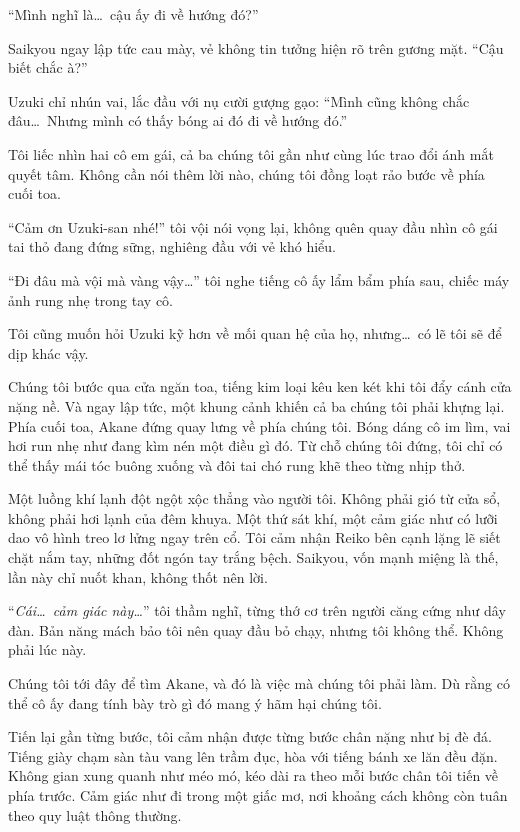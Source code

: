 \documentclass[../main.tex]{subfiles}
\begin{document}
``Mình nghĩ là\dots\ cậu ấy đi về hướng đó?''

Saikyou ngay lập tức cau mày, vẻ không tin tưởng hiện rõ trên gương mặt. ``Cậu biết chắc à?''

Uzuki chỉ nhún vai, lắc đầu với nụ cười gượng gạo: ``Mình cũng không chắc đâu\dots\ Nhưng mình có thấy bóng ai đó đi về hướng đó.''

Tôi liếc nhìn hai cô em gái, cả ba chúng tôi gần như cùng lúc trao đổi ánh mắt quyết tâm. Không cần nói thêm lời nào, chúng tôi đồng loạt rảo bước về phía cuối toa.

``Cảm ơn Uzuki-san nhé!'' tôi vội nói vọng lại, không quên quay đầu nhìn cô gái tai thỏ đang đứng sững, nghiêng đầu với vẻ khó hiểu.

``Đi đâu mà vội mà vàng vậy\dots'' tôi nghe tiếng cô ấy lẩm bẩm phía sau, chiếc máy ảnh rung nhẹ trong tay cô.


Tôi cũng muốn hỏi Uzuki kỹ hơn về mối quan hệ của họ, nhưng\dots\ có lẽ tôi sẽ để dịp khác vậy.

\ct

Chúng tôi bước qua cửa ngăn toa, tiếng kim loại kêu ken két khi tôi đẩy cánh cửa nặng nề. Và ngay lập tức, một khung cảnh khiến cả ba chúng tôi phải khựng lại. Phía cuối toa, Akane đứng quay lưng về phía chúng tôi. Bóng dáng cô im lìm, vai hơi run nhẹ như đang kìm nén một điều gì đó. Từ chỗ chúng tôi đứng, tôi chỉ có thể thấy mái tóc buông xuống và đôi tai chó rung khẽ theo từng nhịp thở.

Một luồng khí lạnh đột ngột xộc thẳng vào người tôi. Không phải gió từ cửa sổ, không phải hơi lạnh của đêm khuya. Một thứ sát khí, một cảm giác như có lưỡi dao vô hình treo lơ lửng ngay trên cổ. Tôi cảm nhận Reiko bên cạnh lặng lẽ siết chặt nắm tay, những đốt ngón tay trắng bệch. Saikyou, vốn mạnh miệng là thế, lần này chỉ nuốt khan, không thốt nên lời.

``\textit{Cái\dots\ cảm giác này\dots}'' tôi thầm nghĩ, từng thớ cơ trên người căng cứng như dây đàn. Bản năng mách bảo tôi nên quay đầu bỏ chạy, nhưng tôi không thể. Không phải lúc này.

Chúng tôi tới đây để tìm Akane, và đó là việc mà chúng tôi phải làm. Dù rằng có thể cô ấy đang tính bày trò gì đó mang ý hãm hại chúng tôi.

Tiến lại gần từng bước, tôi cảm nhận được từng bước chân nặng như bị đè đá. Tiếng giày chạm sàn tàu vang lên trầm đục, hòa với tiếng bánh xe lăn đều đặn. Không gian xung quanh như méo mó, kéo dài ra theo mỗi bước chân tôi tiến về phía trước. Cảm giác như đi trong một giấc mơ, nơi khoảng cách không còn tuân theo quy luật thông thường.
\end{document}
